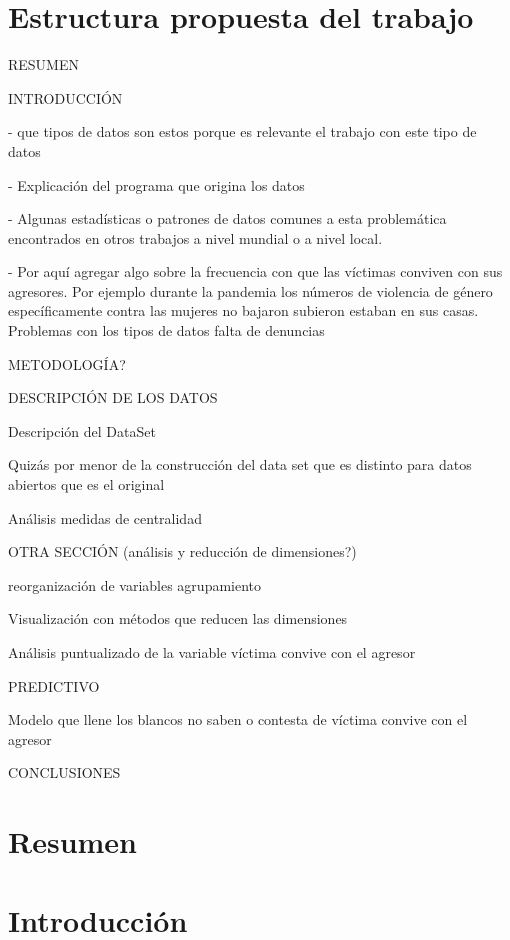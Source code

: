 \documentclass[10 pt]{article}
\begin{document}
\newpage

\section*{Estructura propuesta del trabajo}

RESUMEN

INTRODUCCIÓN 

- que tipos de datos son estos porque es relevante el trabajo con este tipo de datos

- Explicación del programa que origina los datos

- Algunas estadísticas o patrones de datos comunes a esta problemática encontrados en otros trabajos a nivel mundial o a nivel local. 

- Por aquí agregar algo sobre la frecuencia con que las víctimas conviven con sus agresores. Por ejemplo durante la pandemia los números de violencia de género específicamente contra las mujeres no bajaron subieron estaban en sus casas.
Problemas con los tipos de datos falta de denuncias

METODOLOGÍA?

DESCRIPCIÓN DE LOS DATOS

Descripción del DataSet

Quizás por menor de la construcción del data set que es distinto para datos abiertos que es el original

Análisis medidas de centralidad 

OTRA SECCIÓN (análisis y reducción de dimensiones?)

reorganización de variables agrupamiento

Visualización con métodos que reducen las dimensiones

Análisis puntualizado de la variable víctima convive con el agresor

PREDICTIVO

Modelo que llene los blancos no saben o contesta de víctima convive con el agresor

CONCLUSIONES
 

\newpage

\section*{Resumen}





\section*{Introducción}\label{intro}
\end{document}
